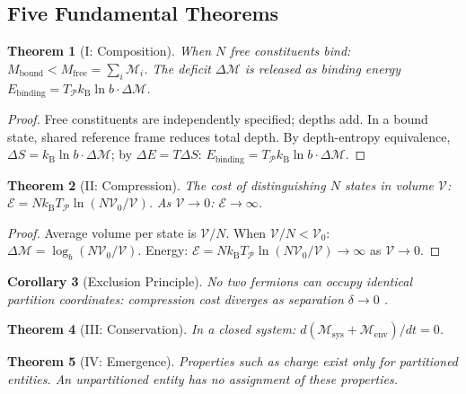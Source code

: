 \documentclass[11pt,twocolumn,a4paper]{article}
\newtheorem{theorem}{Theorem}[section]
\newtheorem{corollary}[theorem]{Corollary}
\theoremstyle{definition}
\theoremstyle{remark}
\newcommand{\kB}{k_{\mathrm{B}}}
\newcommand{\Depth}{\mathcal{M}}
\newcommand{\Cost}{\mathcal{E}}
\newcommand{\Mfree}{M_{\mathrm{free}}}
\newcommand{\Mbound}{M_{\mathrm{bound}}}
\begin{document}
\subsection{Five Fundamental Theorems}

\begin{theorem}[I: Composition]
\label{thm:composition}
When $N$ free constituents bind: $\Mbound < \Mfree = \sum_i \Depth_i$. The deficit $\Delta\Depth$ is released as binding energy $E_{\mathrm{binding}} = T_{\mathcal{P}} \kB \ln b \cdot \Delta\Depth$.
\end{theorem}

\begin{proof}
Free constituents are independently specified; depths add. In a bound state, shared reference frame reduces total depth. By depth-entropy equivalence, $\Delta S = \kB \ln b \cdot \Delta\Depth$; by $\Delta E = T\Delta S$: $E_{\mathrm{binding}} = T_{\mathcal{P}}\kB\ln b\cdot\Delta\Depth$.
\end{proof}

\begin{theorem}[II: Compression]
\label{thm:compression}
The cost of distinguishing $N$ states in volume $\mathcal{V}$: $\Cost = N\kB T_{\mathcal{P}} \ln(N\mathcal{V}_0/\mathcal{V})$. As $\mathcal{V} \to 0$: $\Cost \to \infty$.
\end{theorem}

\begin{proof}
Average volume per state is $\mathcal{V}/N$. When $\mathcal{V}/N < \mathcal{V}_0$: $\Delta\Depth = \log_b(N\mathcal{V}_0/\mathcal{V})$. Energy: $\Cost = N\kB T_{\mathcal{P}}\ln(N\mathcal{V}_0/\mathcal{V}) \to \infty$ as $\mathcal{V} \to 0$.
\end{proof}

\begin{corollary}[Exclusion Principle]
No two fermions can occupy identical partition coordinates: compression cost diverges as separation $\delta \to 0$ \citep{pauli1925}.
\end{corollary}

\begin{theorem}[III: Conservation]
\label{thm:conservation}
In a closed system: $d(\Depth_{\mathrm{sys}} + \Depth_{\mathrm{env}})/dt = 0$.
\end{theorem}

\begin{theorem}[IV: Emergence]
\label{thm:emergence}
Properties such as charge exist only for partitioned entities. An unpartitioned entity has no assignment of these properties.
\end{theorem}
\end{document}
